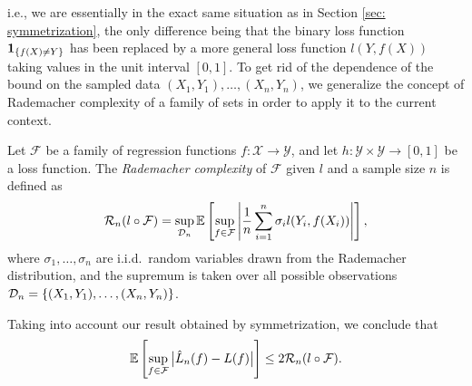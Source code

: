 i.e., we are essentially in the exact same situation as in Section \ref{sec: symmetrization}, the only difference being that the binary loss function $\mathbf{1}_{\left\{f(X) \neq Y\right\}}$ has been replaced by a more general loss function $l(Y, f(X))$ taking values in the unit interval $[0, 1]$. To get rid of the dependence of the bound on the sampled data $(X_1, Y_1), \dots, (X_n, Y_n)$, we generalize the concept of Rademacher complexity of a family of sets in order to apply it to the current context.

\begin{definition}
Let $\mathcal{F}$ be a family of regression functions $f \colon \mathcal{X} \to \mathcal{Y}$, and let $h \colon \mathcal{Y} \times \mathcal{Y} \to [0, 1]$ be a loss function. The \emph{Rademacher complexity} of $\mathcal{F}$ given $l$ and a sample size $n$ is defined as
\[
    \mathcal{R}_n(l \circ \mathcal{F}) = \sup_{\mathcal{D}_n} \mathbb{E}\left[ \sup_{f \in \mathcal{F}} \abs{\frac{1}{n} \sum_{i=1}^n \sigma_i l(Y_i, f(X_i))}\right],
\]
where $\sigma_1, \dots, \sigma_n$ are i.i.d.\ random variables drawn from the Rademacher distribution, and the supremum is taken over all possible observations $\mathcal{D}_n = \left\{(X_1, Y_1), \dots, (X_n, Y_n)\right\}$.
\end{definition}
Taking into account our result obtained by symmetrization, we conclude that
\[
    \mathbb{E}\left[ \sup_{f \in \mathcal{F}} \big\lvert\hat L_n(f) - L(f)\big\rvert \right] \leq 2 \mathcal{R}_n(l \circ \mathcal{F}).
\]
